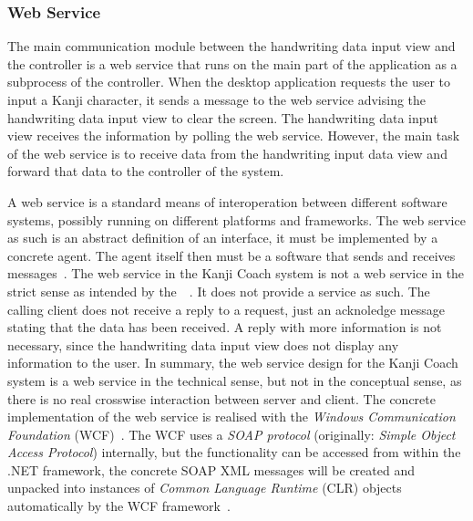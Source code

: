 \subsubsection{Web Service}
\label{sec:arch:webservice}


The main communication module between the handwriting data input view and the 
controller is a web service that runs on the main part of the application
as a subprocess of the controller. When the desktop application requests the 
user to input a Kanji character, it sends a message to the web service 
advising the handwriting data input view to clear the screen. 
The handwriting data input view receives the information by polling the 
web service. However, the main task of the web service is to receive data 
from the handwriting input data view and forward that data to the controller
of the system. 

A web service is a standard means of interoperation between different software
systems, possibly running on different platforms and frameworks. The web service
as such is an abstract definition of an interface, it must be implemented by a 
concrete agent. The agent itself then must be a software that sends and receives 
messages~.
The web service in the Kanji Coach system is not a web service in the strict 
sense as intended by the~~\citeyear{W3C2004}. It does not 
provide a service as such. The calling client does not receive a reply to a 
request, just an acknoledge message stating that the data has been received. 
A reply with more information is not necessary, since the handwriting data 
input view does not display any information to the user. 
In summary, the web service design for the Kanji Coach system is a web service
in the technical sense, but not in the conceptual sense, as there is no real
crosswise interaction between server and client.
The concrete implementation of the web service is realised with the
\emph{Windows Communication Foundation} (WCF)~.
The WCF uses a \emph{SOAP protocol} (originally: 
\emph{Simple Object Access Protocol}) internally, but the functionality can be 
accessed from within the .NET framework, the concrete SOAP XML messages will 
be created and unpacked into instances of \emph{Common Language Runtime} (CLR) 
objects automatically by the WCF 
framework~.

